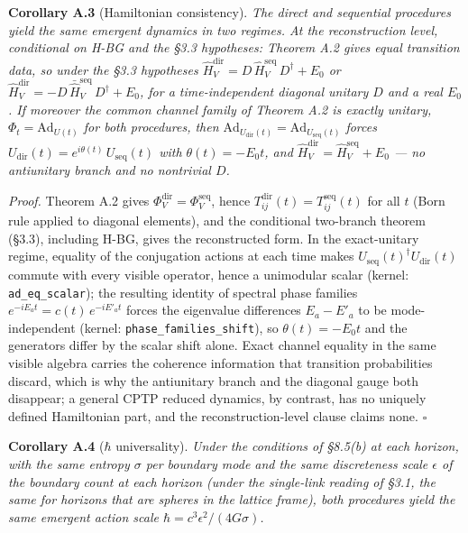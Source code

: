 \documentclass[
]{article}
\begin{document}
\textbf{Corollary A.3} (Hamiltonian consistency). \emph{The direct and
sequential procedures yield the same emergent dynamics in two regimes.
At the reconstruction level, conditional on H-BG and the §3.3
hypotheses: Theorem A.2 gives equal transition data, so under the §3.3
hypotheses
\(\hat{H}_V^{\text{dir}} = D\,\hat{H}_V^{\text{seq}}\,D^\dagger + E_0\)
or
\(\hat{H}_V^{\text{dir}} = -D\,\bar{\hat{H}}_V^{\text{seq}}\,D^\dagger + E_0\),
for a time-independent diagonal unitary \(D\) and a real \(E_0\). If
moreover the common channel family of Theorem A.2 is exactly unitary,
\(\Phi_t = \mathrm{Ad}_{U(t)}\) for both procedures, then
\(\mathrm{Ad}_{U_{\text{dir}}(t)} = \mathrm{Ad}_{U_{\text{seq}}(t)}\)
forces \(U_{\text{dir}}(t) = e^{i\theta(t)}\,U_{\text{seq}}(t)\) with
\(\theta(t) = -E_0 t\), and
\(\hat{H}_V^{\text{dir}} = \hat{H}_V^{\text{seq}} + E_0\) --- no
antiunitary branch and no nontrivial \(D\).}

\emph{Proof.} Theorem A.2 gives
\(\Phi_V^{\text{dir}} = \Phi_V^{\text{seq}}\), hence
\(T^{\text{dir}}_{ij}(t) = T^{\text{seq}}_{ij}(t)\) for all \(t\) (Born
rule applied to diagonal elements), and the conditional two-branch
theorem (§3.3), including H-BG, gives the reconstructed form. In the
exact-unitary regime, equality of the conjugation actions at each time
makes \(U_{\text{seq}}(t)^\dagger U_{\text{dir}}(t)\) commute with every
visible operator, hence a unimodular scalar (kernel:
\texttt{ad\_eq\_scalar}); the resulting identity of spectral phase
families \(e^{-iE_a t} = c(t)\,e^{-iE'_a t}\) forces the eigenvalue
differences \(E_a - E'_a\) to be mode-independent (kernel:
\texttt{phase\_families\_shift}), so \(\theta(t) = -E_0 t\) and the
generators differ by the scalar shift alone. Exact channel equality in
the same visible algebra carries the coherence information that
transition probabilities discard, which is why the antiunitary branch
and the diagonal gauge both disappear; a general CPTP reduced dynamics,
by contrast, has no uniquely defined Hamiltonian part, and the
reconstruction-level clause claims none. \(\square\)

\textbf{Corollary A.4} (\(\hbar\) universality). \emph{Under the
conditions of §8.5(b) at each horizon, with the same entropy \(\sigma\)
per boundary mode and the same discreteness scale \(\epsilon\) of the
boundary count at each horizon (under the single-link reading of §3.1,
the same for horizons that are spheres in the lattice frame), both
procedures yield the same emergent action scale
\(\hbar = c^3 \epsilon^2 / (4G\sigma)\).}
\end{document}
